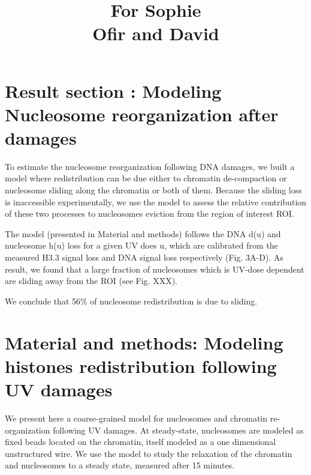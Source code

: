 \documentclass[12pt]{article}
\begin{document}
	
\title{ For Sophie\\Ofir and David}
\maketitle


\section{Result section : Modeling Nucleosome reorganization after damages}
To estimate the nucleosome reorganization following DNA damages, we built a model where redistribution can be due either to chromatin de-compaction or nucleosome sliding along the chromatin or both of them.  Because the sliding loss is inaccessible experimentally, we use the model to assess the relative contribution of these two processes to nucleosomes eviction from the region of interest ROI.

The model (presented in Material and methods) follows the DNA d(u) and nucleosome h(u) loss for a given UV does u, which are calibrated from the measured  H3.3 signal loss and DNA signal loss respectively (Fig. 3A-D). As result, we found that a large fraction of nucleosomes which is UV-dose dependent are sliding away from the ROI (see Fig. XXX).

We conclude that 56\% of nucleosome redistribution is due to sliding.


\section{Material and methods: Modeling  histones redistribution following UV damages}
We present here a coarse-grained model for nucleosomes and chromatin re-organization following UV damages. At steady-state, nucleosomes are modeled as fixed beads located on the chromatin, itself modeled as a one dimensional unstructured wire. We use the model to study the relaxation of the chromatin and nucleosomes to a steady state, measured after 15 minutes.
\end{document}
